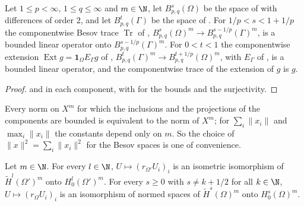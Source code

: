 \begin{theorem}
\label{thm:vector-besov-trace}
\leanok
{}
Let $1 \leq p < \infty$, $1 \leq q \leq \infty$ and $m \in \N$, let $B^s_{p,q}(\Omega)$ be the
space of  with differences of order $2$, and let $B^t_{p,q}(\Gamma)$
be the space of . For $1/p < s < 1 + 1/p$ the componentwise Besov
trace $\operatorname{Tr}$ of ,
$B^s_{p,q}(\Omega)^m \to B^{s-1/p}_{p,q}(\Gamma)^m$, is a bounded linear operator onto
$B^{s-1/p}_{p,q}(\Gamma)^m$. For $0 < t < 1$ the componentwise extension
$\operatorname{Ext} g = \mathbf 1_\Omega E_\Gamma g$ of ,
$B^t_{p,q}(\Gamma)^m \to B^{t+1/p}_{p,q}(\Omega)^m$, with $E_\Gamma$ of
, is a bounded linear operator, and the componentwise trace
of the extension of $g$ is $g$.
\end{theorem}

\begin{proof}
\leanok
{} and  in each component, with
 for the bounds and the surjectivity.
\end{proof}

Every norm on $X^m$ for which the inclusions and the projections of the components are bounded is
equivalent to the norm of $X^m$; for $\sum_i \|x_i\|$ and $\max_i \|x_i\|$ the constants depend
only on $m$. So the choice of $\|x\|^2 = \sum_i \|x_i\|^2$ for the Besov spaces is one of
convenience.

\begin{theorem}
\label{thm:vector-tilde-zero-boundary}
\leanok
{}
Let $m \in \N$. For every $l \in \N$, $U \mapsto (r_{\Omega'} U_i)_i$ is an isometric
isomorphism of $\tilde H^l(\Omega')^m$ onto $H^l_0(\Omega')^m$. For every $s \geq 0$ with
$s \neq k + 1/2$ for all $k \in \N$, $U \mapsto (r_\Omega U_i)_i$ is an isomorphism of normed
spaces of $\tilde H^s(\Omega)^m$ onto $H^s_0(\Omega)^m$.
\end{theorem}

